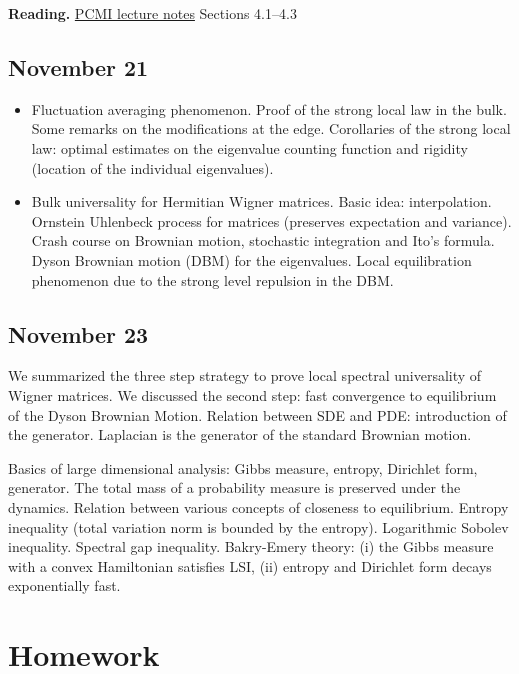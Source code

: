 \documentclass[a4paper]{article}
\begin{document}
\textbf{Reading.} \href{pcmi.pdf}{PCMI lecture notes} Sections 4.1–4.3


\subsection{November 21%
  \label{november-21}%
}

\begin{itemize}
\item Fluctuation averaging phenomenon. Proof of the strong local law in the bulk. Some remarks on the modifications at the edge. Corollaries of the strong local law: optimal estimates on the eigenvalue counting function and rigidity (location of the individual eigenvalues).

\item Bulk universality for Hermitian Wigner matrices. Basic idea: interpolation. Ornstein Uhlenbeck process for matrices (preserves expectation and variance). Crash course on Brownian motion, stochastic integration and Ito’s formula. Dyson Brownian motion (DBM) for the eigenvalues. Local equilibration phenomenon due to the strong level repulsion in the DBM.
\end{itemize}


\subsection{November 23%
  \label{november-23}%
}

We summarized the three step strategy to prove local spectral universality of Wigner matrices. We discussed the second step: fast convergence to equilibrium of the Dyson Brownian Motion. Relation between SDE and PDE: introduction of the generator. Laplacian is the generator of the standard Brownian motion.

Basics of large dimensional analysis: Gibbs measure, entropy, Dirichlet form, generator. The total mass of a probability measure is preserved under the dynamics. Relation between various concepts of closeness to equilibrium. Entropy inequality (total variation norm is bounded by the entropy). Logarithmic Sobolev inequality. Spectral gap inequality. Bakry-Emery theory: (i) the Gibbs measure with a convex Hamiltonian satisfies LSI, (ii) entropy and
Dirichlet form decays exponentially fast.


\section{Homework%
  \label{homework}%
}
\end{document}
